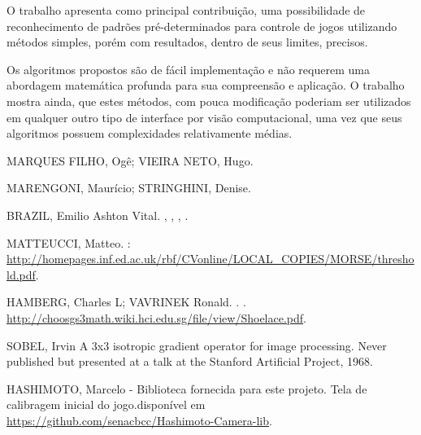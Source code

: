 \documentclass[12pt]{article}
\begin{document}
O trabalho apresenta como principal contribuição, uma possibilidade de reconhecimento de padrões pré-determinados  para controle de jogos utilizando métodos simples, porém com resultados, dentro de seus limites, precisos.

Os algoritmos propostos são de fácil implementação e não requerem uma abordagem matemática profunda para sua compreensão e aplicação. O trabalho mostra ainda, que estes métodos, com pouca modificação poderiam ser utilizados em qualquer outro tipo de interface por visão computacional, uma vez que seus algoritmos possuem complexidades relativamente médias.


\begin{thebibliography}{2}
{MARQUES FILHO, Ogê; VIEIRA NETO, Hugo.}

{MARENGONI, Maurício; STRINGHINI, Denise}. 

{BRAZIL, Emilio Ashton Vital}.
,
,
,
.


MATTEUCCI, Matteo. 
: 
\url{http://homepages.inf.ed.ac.uk/rbf/CVonline/LOCAL_COPIES/MORSE/threshold.pdf}.

{HAMBERG, Charles L; VAVRINEK Ronald}.
.
.
\url{http://choosgs3math.wiki.hci.edu.sg/file/view/Shoelace.pdf}.

{SOBEL, Irvin}
\newblock A 3x3 isotropic gradient operator for image processing.
\newblock Never published but presented at a talk at the Stanford Artificial
  Project, 1968.

HASHIMOTO, Marcelo - Biblioteca fornecida para este projeto.
Tela de calibragem inicial do jogo.disponível em \url{https://github.com/senacbcc/Hashimoto-Camera-lib}.

\end{thebibliography}
\end{document}
